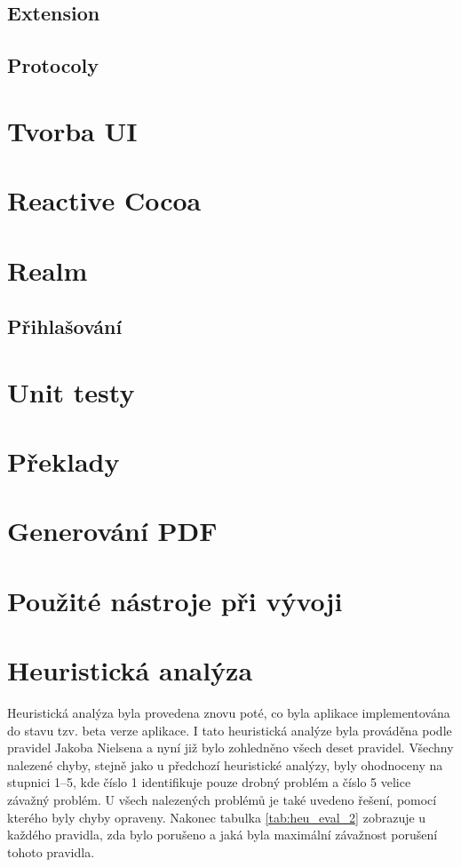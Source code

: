 \documentclass[thesis=M,czech]{FITthesis}[2012/06/26]
\begin{document}
	\subsection{Extension}
	
	\subsection{Protocoly}
	
\section{Tvorba UI}

\section{Reactive Cocoa}

\section{Realm}

	\subsection{Přihlašování}

\section{Unit testy}

\section{Překlady}

\section{Generování PDF}

\section{Použité nástroje při vývoji}

\section{Heuristická analýza}
Heuristická analýza byla provedena znovu poté, co byla aplikace implementována do stavu tzv. beta verze aplikace. I tato heuristická analýze byla prováděna podle pravidel Jakoba Nielsena a nyní již bylo zohledněno všech deset pravidel. Všechny nalezené chyby, stejně jako u předchozí heuristické analýzy, byly ohodnoceny na stupnici 1--5, kde číslo 1 identifikuje pouze drobný problém a číslo 5 velice závažný problém. U všech nalezených problémů je také uvedeno řešení, pomocí kterého byly chyby opraveny. Nakonec tabulka \ref{tab:heu_eval_2} zobrazuje u každého pravidla, zda bylo porušeno a jaká byla maximální závažnost porušení tohoto pravidla.
\end{document}
